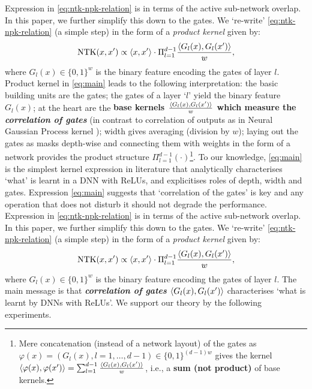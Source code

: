 Expression in \eqref{eq:ntk-npk-relation} is in terms of the active sub-network overlap. In this paper, we further simplify this down to the gates. We `re-write' \eqref{eq:ntk-npk-relation} (a simple step) in the form of a \emph{product kernel} given by:
\begin{align}\label{eq:main}
\text{NTK}(x,x') \propto \langle x,x'\rangle\cdot \Pi_{l=1}^{d-1} \frac{\langle G_l(x),G_l(x')\rangle}w, 
 \end{align}
where $G_l(x)\in\{0,1\}^w$ is the binary feature encoding the gates of layer $l$. Product kernel in \eqref{eq:main} leads to the following interpretation: the basic building units are the gates; the gates of a layer `$l$' yield the binary feature $G_l(x)$; at the heart are the \textbf{base kernels  $\frac{\langle G_l(x),G_l(x')\rangle}w$ which measure the \emph{correlation of gates}} (in contrast to correlation of outputs as in Neural Gaussian Process kernel ); width gives averaging (division by $w$); laying out the gates as masks depth-wise and connecting them with weights in the form of a network provides the product structure $\Pi_{l=1}^{d-1} (\cdot)$\footnote{Mere concatenation (instead of a network layout) of the gates as $\varphi(x)=(G_l(x),l=1,\ldots,d-1)\in\{0,1\}^{(d-1)w}$ gives the kernel $\langle \varphi(x),\varphi(x')\rangle=\sum_{l=1}^{d-1}\frac{\langle G_l(x),G_l(x')\rangle}w$, i.e., a \textbf{sum  (not product)} of base kernels.}. To our knowledge, \eqref{eq:main} is the simplest kernel expression in literature that analytically characterises `what' is learnt in a DNN with ReLUs, and explicitises roles of depth, width and gates. Expression \eqref{eq:main} suggests that `correlation of the gates' is key and any operation that does not disturb it should not degrade the performance. 
Expression in \eqref{eq:ntk-npk-relation} is in terms of the active sub-network overlap. In this paper, we further simplify this down to the gates. We `re-write' \eqref{eq:ntk-npk-relation} (a simple step) in the form of a \emph{product kernel} given by:
\begin{align}\label{eq:main}
\text{NTK}(x,x') \propto \langle x,x'\rangle\cdot \Pi_{l=1}^{d-1} \frac{\langle G_l(x),G_l(x')\rangle}w, 
 \end{align}
where $G_l(x)\in\{0,1\}^w$ is the binary feature encoding the gates of layer $l$. The main message is that \textbf{\emph{correlation of gates} $\langle G_l(x),G_l(x')\rangle$} characterises `what is learnt by DNNs with ReLUs'. We support our theory by the following experiments.
